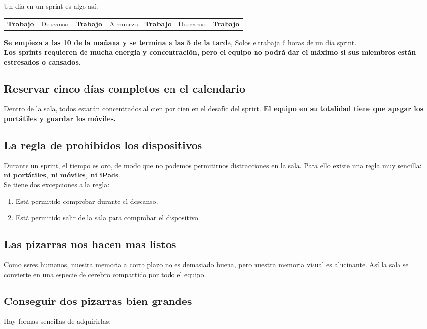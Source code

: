 \documentclass[10pt]{article}
\begin{document}
Un dia en un sprint es algo así:
\begin{center}
\begin{tabular}{c c c c c c c}
\textbf{Trabajo}&Descanso&\textbf{Trabajo}&Almuerzo&\textbf{Trabajo}&Descanso&\textbf{Trabajo}\\
\end{tabular}
\end{center}
\begin{multicols}{2}
\textbf{Se empieza a las 10 de la mañana y se termina a las 5 de la tarde}, Solos e trabaja 6 horas de un día sprint.\\
\textbf{Los sprints requieren de mucha energía y concentración, pero el equipo no podrá dar el máximo si sus miembros están estresados o cansados}.
\subsection*{Reservar cinco días completos en el calendario}
Dentro de la sala, todos estarán concentrados al cien por cien en el desafío del sprint. \textbf{El equipo en su totalidad tiene que apagar los portátiles y guardar los móviles.}
\subsection*{La regla de prohibidos los dispositivos}
Durante un sprint, el tiempo es oro, de modo que no podemos permitirnos distracciones en la sala. Para ello existe una regla muy sencilla: \textbf{ni portátiles, ni móviles, ni iPads.}\\
Se tiene dos excepciones a la regla:
\begin{enumerate}[\bfseries 1.]
\item Está permitido comprobar durante el descanso.
\item Está permitido salir de la sala para comprobar el dispositivo.
\end{enumerate}
\subsection*{Las pizarras nos hacen mas listos}
Como seres humanos, nuestra memoria a corto plazo no es demasiado buena, pero nuestra memoria visual es alucinante. Así la sala se convierte en una especie de cerebro compartido por todo el equipo.\\
\subsection*{Conseguir dos pizarras bien grandes}
Hay formas sencillas de adquirirlas:

\end{multicols}
\end{document}
